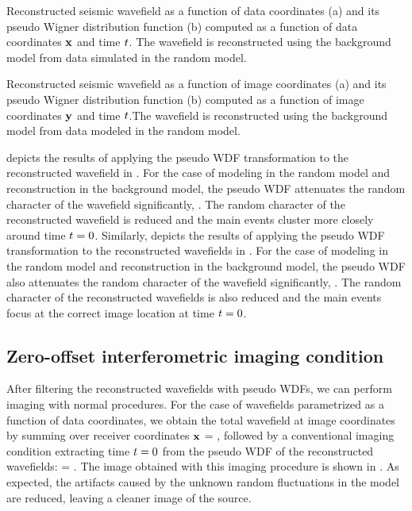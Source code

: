 
 {Reconstructed
seismic wavefield as a function of data coordinates (a) and its pseudo
Wigner distribution function (b) computed as a function of data
coordinates ${\mathbf{x}}$ and time ${t}$. The wavefield is reconstructed using
the background model from data simulated in the random model.}


 {Reconstructed
seismic wavefield as a function of image coordinates (a) and its
pseudo Wigner distribution function (b) computed as a function of
image coordinates ${\mathbf{y}}$ and time ${t}$.The wavefield is reconstructed
using the background model from data modeled in the random model.}


 depicts the results of applying the pseudo WDF 
transformation to the reconstructed wavefield in .
%
For the case of modeling in the random model and reconstruction in the
background model, the pseudo WDF attenuates the random character of
the wavefield significantly, . The random character of
the reconstructed wavefield is reduced and the main events cluster
more closely around time ${t}=0$. Similarly,  depicts
the results of applying the pseudo WDF transformation to the
reconstructed wavefields in .
%
For the case of modeling in the random model and reconstruction in the
background model, the pseudo WDF also attenuates the random character
of the wavefield significantly, . The random character
of the reconstructed wavefields is also reduced and the main events
focus at the correct image location at time ${t}=0$.

\subsection{Zero-offset interferometric imaging condition}

After filtering the reconstructed wavefields with pseudo WDFs, we can
perform imaging with normal procedures. For the case of wavefields
parametrized as a function of data coordinates, we obtain the total
wavefield at image coordinates by summing over receiver coordinates
${\mathbf{x}}$
%
\beq \label{eqn:wxx2}
 = \intxm {}\;,
\eeq
%
followed by a conventional imaging condition extracting time ${t}=0$
from the pseudo WDF of the reconstructed wavefields:
%
\beq \label{eqn:ixx}
 =  \;.
\eeq
%
The image obtained with this imaging procedure is shown in
. As expected, the artifacts caused by the unknown
random fluctuations in the model are reduced, leaving a
cleaner image of the source.

